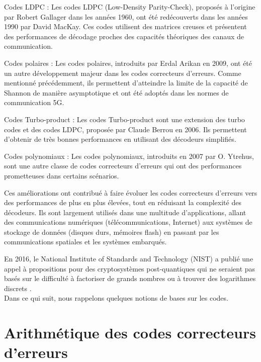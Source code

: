 \documentclass[12pt,openany]{report}
\begin{document}
Codes LDPC : Les codes LDPC (Low-Density Parity-Check), proposés à l'origine par Robert Gallager dans les années 1960, ont été redécouverts dans les années 1990 par David MacKay. Ces codes utilisent des matrices creuses et présentent des performances de décodage proches des capacités théoriques des canaux de communication.

Codes polaires : Les codes polaires, introduits par Erdal Arikan en 2009, ont été un autre développement majeur dans les codes correcteurs d'erreurs. Comme mentionné précédemment, ils permettent d'atteindre la limite de la capacité de Shannon de manière asymptotique et ont été adoptés dans les normes de communication 5G.

Codes Turbo-product : Les codes Turbo-product sont une extension des turbo codes et des codes LDPC, proposée par Claude Berrou en 2006. Ils permettent d'obtenir de très bonnes performances en utilisant des décodeurs simplifiés.

Codes polynomiaux : Les codes polynomiaux, introduits en 2007 par O. Ytrehus, sont une autre classe de codes correcteurs d'erreurs qui ont des performances prometteuses dans certains scénarios.

Ces améliorations ont contribué à faire évoluer les codes correcteurs d'erreurs vers des performances de plus en plus élevées, tout en réduisant la complexité des décodeurs. Ils sont largement utilisés dans une multitude d'applications, allant des communications numériques (télécommunications, Internet) aux systèmes de stockage de données (disques durs, mémoires flash) en passant par les communications spatiales et les systèmes embarqués.


En 2016, le National Institute of Standards and Technology (NIST) a publié une
appel à propositions pour des cryptosystèmes post-quantiques qui ne seraient pas basés sur le
difficulté à factoriser de grands nombres ou à trouver des logarithmes discrets .\\
Dans ce qui suit, nous rappelons quelques notions de bases sur les codes. 

\section{Arithmétique des codes correcteurs d'erreurs}
\end{document}
